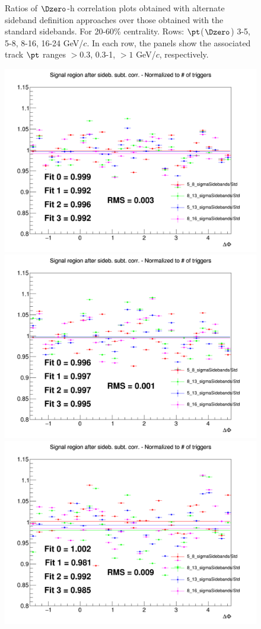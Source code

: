 \begin{figure}
 \caption{Ratios of $\Dzero$-h correlation plots obtained with alternate sideband definition approaches over those obtained with the standard sidebands. For 20-60\% centrality. Rows: $\pt$($\Dzero$) 3-5, 5-8, 8-16, 16-24 GeV/$c$. In each row, the panels show the associated track
$\pt$ ranges $> 0.3$, 0.3-1, $> 1$ GeV/$c$, respectively.}
\label{fig:SysBkg2060}
\end{figure}


\begin{figure}
\centering
{\includegraphics[width=0.31\linewidth]{figuresVsCent/Dstar/SystSideb/20_60/Ratio_AzimCorrDistr_Dstar_Canvas_PtIntBins2to3_PoolInt_thr03to99_Sideband_2060.png}}
{\includegraphics[width=0.31\linewidth]{figuresVsCent/Dstar/SystSideb/20_60/Ratio_AzimCorrDistr_Dstar_Canvas_PtIntBins2to3_PoolInt_thr03to1_Sideband_2060.png}}
{\includegraphics[width=0.31\linewidth]{figuresVsCent/Dstar/SystSideb/20_60/Ratio_AzimCorrDistr_Dstar_Canvas_PtIntBins2to3_PoolInt_thr1to99_Sideband_2060.png}} \\


\end{figure}
